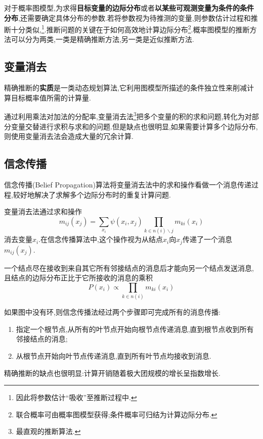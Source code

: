 对于概率图模型,为求得\textbf{目标变量的边际分布}或者\textbf{以某些可观测变量为条件的条件分布},还需要确定具体分布的参数.若将参数视为待推测的变量,则参数估计过程和推断十分类似,\footnote{因此将参数估计``吸收''至推断过程中.}.推断问题的关键在于如何高效地计算边际分布\footnote{联合概率可由概率图模型获得;条件概率可归结为计算边际分布.}.概率图模型的推断方法可以分为两类,一类是精确推断方法,另一类是近似推断方法.

\subsection{变量消去}

精确推断的\textbf{实质}是一类动态规划算法,它利用图模型所描述的条件独立性来削减计算目标概率值所需的计算量.

通过利用乘法对加法的分配率,变量消去法\footnote{最直观的推断算法.}把多个变量的积的求和问题,转化为对部分变量交替进行求积与求和的问题.但是缺点也很明显,如果需要计算多个边际分布,则使用变量消去法会造成大量的冗余计算.

\subsection{信念传播}

信念传播(Belief Propagation)算法将变量消去法中的求和操作看做一个消息传递过程,较好地解决了求解多个边际分布时的重复计算问题.

变量消去法通过求和操作
\begin{equation}
m_{ij}(x_j)=\sum_{x_i}\psi(x_i,x_j)\prod_{k\in n(i)\backslash j}m_{ki}(x_i)
\end{equation}
消去变量$x_i$.在信念传播算法中,这个操作视为从结点$x_i$向$x_j$传递了一个消息$m_{ij}(x_j)$.

一个结点尽在接收到来自其它所有邻接结点的消息后才能向另一个结点发送消息,且结点的边际分布正比于它所接收的消息的乘积
\begin{equation}
P(x_i)\propto\prod_{k\in n(i)}m_{ki}(x_i)
\end{equation}

如果图中没有环,则信念传播法经过两个步骤即可完成所有的消息传播:
\begin{enumerate}
\item 指定一个根节点,从所有的叶节点开始向根节点传递消息,直到根节点收到所有邻接结点的消息;
\item 从根节点开始向叶节点传递消息,直到所有叶节点均接收到消息.
\end{enumerate}

精确推断的缺点也很明显:计算开销随着极大团规模的增长呈指数增长.

